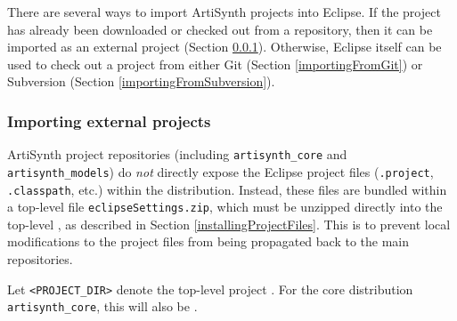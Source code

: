 There are several ways to import ArtiSynth projects into Eclipse.  If
the project has already been downloaded or checked out from a
repository, then it can be imported as an external project
(Section \ref{importingExternalProjects}). Otherwise, Eclipse itself
can be used to check out a project from either Git
(Section \ref{importingFromGit}) or Subversion
(Section \ref{importingFromSubversion}).

\subsubsection{Importing external projects}
\label{importingExternalProjects}

ArtiSynth project repositories (including {\tt artisynth\_core} and
{\tt artisynth\_models}) do {\it not} directly expose the Eclipse
project files ({\tt .project}, {\tt .classpath}, etc.) within the
distribution. Instead, these files are bundled within a top-level file
{\tt eclipseSettings.zip}, which must be unzipped directly into the
top-level \directory{}, as described in Section
\ref{installingProjectFiles}. This is to prevent local modifications to the
project files from being propagated back to the main
repositories. 

Let {\tt <PROJECT\_DIR>} denote the top-level project \directory{}.  For the
core distribution {\tt artisynth\_core}, this will also be
\ArtHome[].


